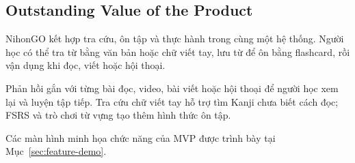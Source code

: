 \subsection{Outstanding Value of the Product}

NihonGO kết hợp tra cứu, ôn tập và thực hành trong cùng một hệ thống. Người học có thể tra từ bằng văn bản hoặc chữ viết tay, lưu từ để ôn bằng flashcard, rồi vận dụng khi đọc, viết hoặc hội thoại.

Phản hồi gắn với từng bài đọc, video, bài viết hoặc hội thoại để người học xem lại và luyện tập tiếp. Tra cứu chữ viết tay hỗ trợ tìm Kanji chưa biết cách đọc; FSRS và trò chơi từ vựng tạo thêm hình thức ôn tập.

Các màn hình minh họa chức năng của MVP được trình bày tại Mục~\ref{sec:feature-demo}.
